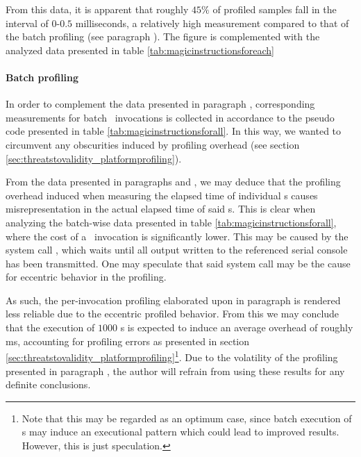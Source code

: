 

From this data, it is apparent that roughly $45\%$ of profiled samples fall in the interval of $0$-$0.5$ milliseconds, a relatively high measurement compared to that of the batch profiling (see paragraph ).
The figure is complemented with the analyzed data presented in table \ref{tab:magicinstructionsforeach}



\paragraph{Batch profiling}
\label{par:results_magicinstructionoverhead_batchprofiling}
In order to complement the data presented in paragraph , corresponding measurements for batch \dvttermmagicinstruction\ invocations is collected in accordance to the pseudo code presented in table \ref{tab:magicinstructionsforall}.
In this way, we wanted to circumvent any obscurities induced by profiling overhead (see section \ref{sec:threatstovalidity_platformprofiling}).



From the data presented in paragraphs  and , we may deduce that the profiling overhead induced when measuring the elapsed time of individual \dvttermmagicinstruction s causes misrepresentation in the actual elapsed time of said \dvttermmagicinstruction s.
This is clear when analyzing the batch-wise data presented in table \ref{tab:magicinstructionsforall}, where the cost of a \dvttermmagicinstruction\ invocation is significantly lower.
This may be caused by the system call , which	waits until all output written to the referenced serial console has been transmitted.
One may speculate that said system call may be the cause for eccentric behavior in the profiling.

As such, the per-invocation profiling elaborated upon in paragraph  is rendered less reliable due to the eccentric profiled behavior.
From this we may conclude that the execution of $1000$ \dvttermmagicinstruction s is expected to induce an average overhead of roughly  ms, accounting for profiling errors as presented in section \ref{sec:threatstovalidity_platformprofiling}\footnote{Note that this may be regarded as an optimum case, since batch execution of \dvttermmagicinstruction s may induce an executional pattern which could lead to improved results. However, this is just speculation.}.
Due to the volatility of the profiling presented in paragraph , the author will refrain from using these results for any definite conclusions.

